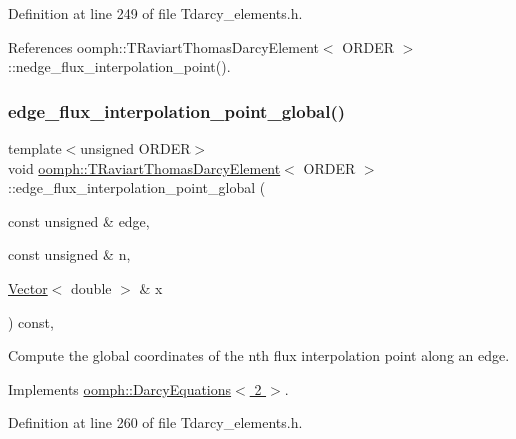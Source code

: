 Definition at line 249 of file Tdarcy\+\_\+elements.\+h.



References oomph\+::\+T\+Raviart\+Thomas\+Darcy\+Element$<$ O\+R\+D\+E\+R $>$\+::nedge\+\_\+flux\+\_\+interpolation\+\_\+point().

\mbox{\label{classoomph_1_1TRaviartThomasDarcyElement_a39394c7bd6d9517135f2befcd5e7d646}} 
\subsubsection{\texorpdfstring{edge\+\_\+flux\+\_\+interpolation\+\_\+point\+\_\+global()}{edge\_flux\_interpolation\_point\_global()}\hspace{0.1cm}{\footnotesize\ttfamily [2/2]}}
{\footnotesize\ttfamily template$<$unsigned O\+R\+D\+ER$>$ \\
void \hyperlink{classoomph_1_1TRaviartThomasDarcyElement}{oomph\+::\+T\+Raviart\+Thomas\+Darcy\+Element}$<$ O\+R\+D\+ER $>$\+::edge\+\_\+flux\+\_\+interpolation\+\_\+point\+\_\+global (\begin{DoxyParamCaption}\item[{const unsigned \&}]{edge,  }\item[{const unsigned \&}]{n,  }\item[{\hyperlink{classoomph_1_1Vector}{Vector}$<$ double $>$ \&}]{x }\end{DoxyParamCaption}) const\hspace{0.3cm}{\ttfamily [inline]}, {\ttfamily [virtual]}}



Compute the global coordinates of the nth flux interpolation point along an edge. 



Implements \hyperlink{classoomph_1_1DarcyEquations_a46a2b8488be8bb249852b4771b25c30a}{oomph\+::\+Darcy\+Equations$<$ 2 $>$}.



Definition at line 260 of file Tdarcy\+\_\+elements.\+h.



